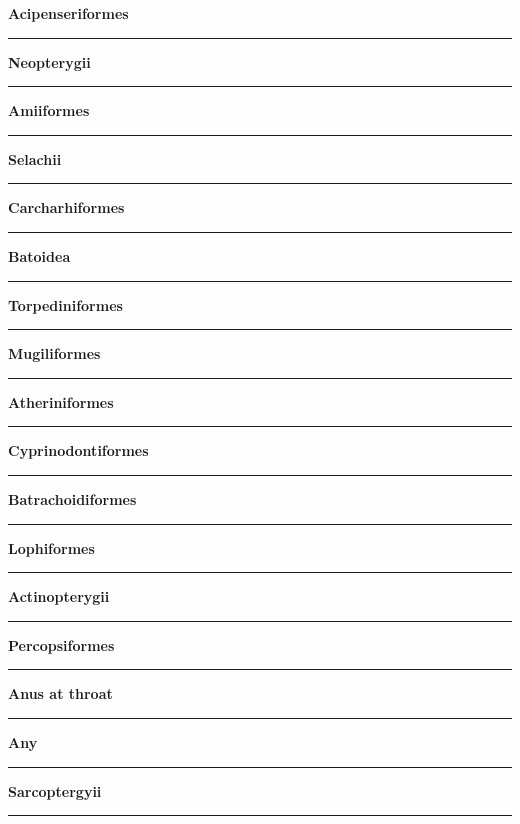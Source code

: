 \documentclass[11pt]{exam}
\newcommand*\Matching[1]{
\ifprintanswers
	\textbf{#1}
\else
	\rule{2.1in}{0.4pt}
\fi
}
\newlength\matchlena
\newlength\matchlenb
\newcommand\MatchQuestion[2]{%
	\setlength\matchlenb{\linewidth}
	\addtolength\matchlenb{-\matchlena}
	\parbox[t]{\matchlena}{\Matching{#1}}\enspace\parbox[t]{\matchlenb}{#2}}
\begin{document}
\begin{questions}
\begin{multicols}{2}
\question\MatchQuestion{Acipenseriformes}{}
\vspace{2\baselineskip}
%
\question\MatchQuestion{Neopterygii}{}
\vspace{2\baselineskip}

\question\MatchQuestion{Amiiformes}{}
\vspace{2\baselineskip}

\question\MatchQuestion{Selachii}{}
\vspace{2\baselineskip}

\question\MatchQuestion{Carcharhiformes}{}
\vspace{2\baselineskip}

\question\MatchQuestion{Batoidea}{}

\columnbreak

\question\MatchQuestion{Torpediniformes}{}
\vspace{2\baselineskip}

\question\MatchQuestion{Mugiliformes}{}
\vspace{2\baselineskip}

\question\MatchQuestion{Atheriniformes}{}
\vspace{2\baselineskip}

\question\MatchQuestion{Cyprinodontiformes}{}
\vspace{2\baselineskip}

\question\MatchQuestion{Batrachoidiformes}{}
\vspace{2\baselineskip}

\question\MatchQuestion{Lophiformes}{}
\vspace{2\baselineskip}

\question\MatchQuestion{Actinopterygii}{}
\vspace{2\baselineskip}

\question\MatchQuestion{Percopsiformes}{}
\vspace{2\baselineskip}

\question\MatchQuestion{Anus at throat}{}
\vspace{2\baselineskip}

\question[\textsc{ec}]\MatchQuestion{Any}{}
\vspace{2\baselineskip}

\question\MatchQuestion{Sarcoptergyii}{}



\end{multicols}

\end{questions}
\end{document}
